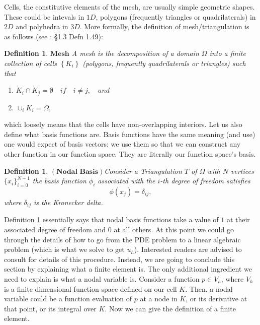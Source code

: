 \documentclass[12pt,a4paper]{article}
\newtheorem{definition}[theorem]{Definition}
\theoremstyle{definition}
\begin{document}
Cells, the constitutive elements of the mesh, are usually simple geometric shapes.  These could be intevals in $1D$, polygons (frequently triangles or quadrilaterals) in $2D$ and polyhedra in $3D$.  More formally, the definition of mesh/triangulation is as follows (see \cite{ern2013theory}: \S 1.3 Defn 1.49): 
\theoremstyle{definition}
\begin{definition}{$\textbf{Mesh}$} 
A mesh is the decomposition of a domain $\Omega$ into a finite collection of cells $\left \lbrace K_i\right\rbrace$ (polygons, frequently quadrilaterals or triangles)  such that
\begin{enumerate}
\item $ \mathring{K}_i \cap \mathring{K}_j = \emptyset\quad if\quad i\neq j,\quad and$
\item $\cup_i K_i = \overline{\Omega},$
\end{enumerate}
\end{definition}
which loosely means that the cells have non-overlapping interiors.   Let us also define what basis functions are.  Basis functions have the same meaning (and use) one would expect of basis vectors: we use them so that we can construct any other function in our function space.  They are literally our function space's basis.  
\begin{definition}{$\left(\textbf{Nodal Basis}\right)$}\label{defn_nodal_basis}
	Consider a Triangulation $T$ of $\Omega$ with $N$ vertices $\lbrace x_i\rbrace_{i=0}^{N-1}$ the basis function $\phi_i$ associated with the $i$-th degree of freedom satisfies 
	\begin{equation}
	\phi\left(x_j\right) = \delta_{ij},
	\end{equation}
	where $ \delta_{ij}$ is the Kronecker delta.
\end{definition}
Definition \ref{defn_nodal_basis} essentially says that nodal basis functions take a value of $1$ at their associated degree of freedom and $0$ at all others.
At this point we could go through the details of how to go from the PDE problem to a linear algebraic problem (which is what we solve to get $u_h$).  Interested readers are advised to consult \cite{elman2014finite} for details of this procedure.  Instead, we are going to conclude this section by explaining what a finite element is.  The only additional ingredient we need to explain is what a nodal variable is.  Consider a function $p\in V_h$, where $V_h$ is a finite dimensional function space defined on our cell $K$.  Then, a nodal variable could be a function evaluation of $p$ at a node in $K$, or its derivative at that point, or its integral over $K$.  Now we can give the definition of a finite element.
\end{document}
